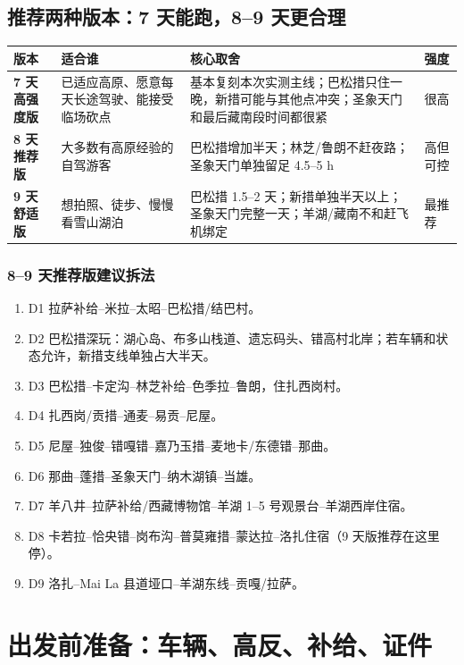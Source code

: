 \documentclass[10.5pt,a4paper]{ctexart}
\begin{document}
\subsection{推荐两种版本：7 天能跑，8--9 天更合理}

\begin{longtable}{p{2.3cm}p{5.8cm}p{5.9cm}p{2.6cm}}
\toprule
版本 & 适合谁 & 核心取舍 & 强度 \\
\midrule
\textbf{7 天高强度版} & 已适应高原、愿意每天长途驾驶、能接受临场砍点 & 基本复刻本次实测主线；巴松措只住一晚，新措可能与其他点冲突；圣象天门和最后藏南段时间都很紧 & 很高 \\
\textbf{8 天推荐版} & 大多数有高原经验的自驾游客 & 巴松措增加半天；林芝/鲁朗不赶夜路；圣象天门单独留足 4.5--5 h & 高但可控 \\
\textbf{9 天舒适版} & 想拍照、徒步、慢慢看雪山湖泊 & 巴松措 1.5--2 天；新措单独半天以上；圣象天门完整一天；羊湖/藏南不和赶飞机绑定 & 最推荐 \\
\bottomrule
\end{longtable}

\subsubsection{8--9 天推荐版建议拆法}
\begin{enumerate}
  \item D1 拉萨补给--米拉--太昭--巴松措/结巴村。
  \item D2 巴松措深玩：湖心岛、布多山栈道、遗忘码头、错高村北岸；若车辆和状态允许，新措支线单独占大半天。
  \item D3 巴松措--卡定沟--林芝补给--色季拉--鲁朗，住扎西岗村。
  \item D4 扎西岗/贡措--通麦--易贡--尼屋。
  \item D5 尼屋--独俊--错嘎错--嘉乃玉措--麦地卡/东德错--那曲。
  \item D6 那曲--蓬措--圣象天门--纳木湖镇--当雄。
  \item D7 羊八井--拉萨补给/西藏博物馆--羊湖 1--5 号观景台--羊湖西岸住宿。
  \item D8 卡若拉--恰央错--岗布沟--普莫雍措--蒙达拉--洛扎住宿（9 天版推荐在这里停）。
  \item D9 洛扎--Mai La 县道垭口--羊湖东线--贡嘎/拉萨。
\end{enumerate}

\section{出发前准备：车辆、高反、补给、证件}
\end{document}
